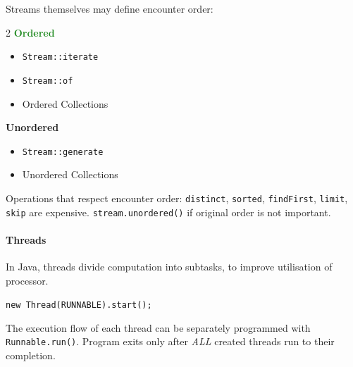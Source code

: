 Streams themselves may define encounter order:
\begin{multicols*}{2}
  \textcolor{ForestGreen}{\textbf{Ordered}}
  \begin{itemize}
    \item \verb$Stream::iterate$
    \item \verb$Stream::of$
    \item Ordered Collections
  \end{itemize}
  \textcolor{Bittersweet}{\textbf{Unordered}}
  \begin{itemize}
    \item \verb$Stream::generate$
    \item Unordered Collections
  \end{itemize}
\end{multicols*}
Operations that respect encounter order: \verb|distinct|, \verb|sorted|,
\verb$findFirst$, \verb$limit$, \verb$skip$ are expensive.
\verb|stream.unordered()| if original order is not important.
\paragraph{Threads}
In Java, threads divide computation into subtasks, to improve utilisation of
processor.
\begin{center}
  \verb$new Thread(RUNNABLE).start();$
\end{center}
The execution flow of each thread can be separately programmed with
\verb$Runnable.run()$. Program exits only after \emph{ALL} created threads run
to their completion.
